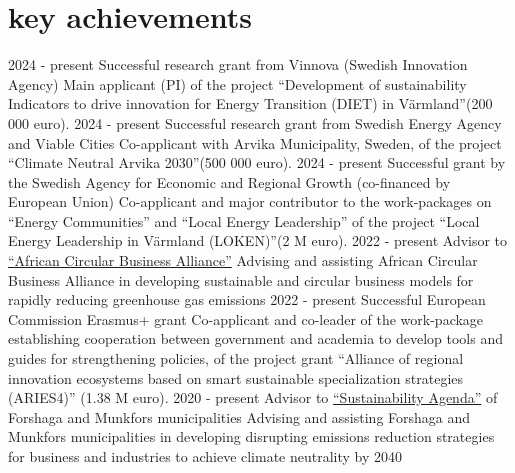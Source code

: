 \documentclass[]{friggeri-cv} %
\begin{document}
\section{key achievements}

\begin{entrylist}
\entry
{\small{2024 - present}}
{Successful research grant from Vinnova (Swedish Innovation Agency)}
{}
{Main applicant (PI) of the project ``Development of sustainability Indicators to drive innovation for Energy Transition (DIET) in Värmland''(200 000 euro).}
\entry
{\small{2024 - present}}
{Successful research grant from Swedish Energy Agency and Viable Cities}
{}
{Co-applicant with Arvika Municipality, Sweden, of the project ``Climate Neutral Arvika 2030''(500 000 euro).}
\entry
{\small{2024 - present}}
{Successful grant by the Swedish Agency for Economic and Regional Growth (co-financed by European Union)}
{}
{Co-applicant and major contributor to the work-packages on ``Energy Communities'' and ``Local Energy Leadership'' of the project ``Local Energy Leadership in Värmland (LOKEN)''(2 M euro).}
\entry
{\small{2022 - present}}
{Advisor to \href{https://acba.africa}{``African Circular Business Alliance''}}
{}
{Advising and assisting African Circular Business Alliance in developing sustainable and circular business models for rapidly reducing greenhouse gas emissions}
\entry
{\small{2022 - present}}
{Successful European Commission Erasmus+ grant}
{}
{Co-applicant and co-leader of the work-package establishing cooperation between government and academia to develop tools and guides for strengthening policies, of the project grant ``Alliance of regional innovation ecosystems based on smart sustainable specialization strategies (ARIES4)'' (1.38 M euro).}
\entry
{\small{2020 - present}}
{Advisor to \href{https://www.forshaga.se/jobbochforetagande/startaochdrivaforetag/natverkochsamarbeten/natverkethallbaragenda.4.491d250d1775b5bab0279483.html}{``Sustainability Agenda''} of Forshaga and Munkfors municipalities}
{}
{Advising and assisting Forshaga and Munkfors municipalities in developing disrupting emissions reduction strategies for business and industries to achieve climate neutrality by 2040}

\end{entrylist}
\end{document}
